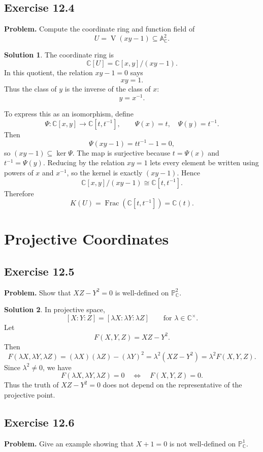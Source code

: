 \documentclass[11pt]{article}
\theoremstyle{definition}
\newtheorem*{solution}{Solution}
\newcommand{\A}{\mathbb{A}}
\newcommand{\C}{\mathbb{C}}
\newcommand{\Pj}{\mathbb{P}}
\newcommand{\K}{K}
\newcommand{\V}{\operatorname{V}}
\newcommand{\Frac}{\operatorname{Frac}}
\begin{document}
\subsection*{Exercise 12.4}
\textbf{Problem.}  Compute the coordinate ring and function field of
\[
  U=\V(xy-1)\subseteq \A^2_{\C}.
\]

\begin{solution}
The coordinate ring is
\[
  \C[U]=\C[x,y]/(xy-1).
\]
In this quotient, the relation \(xy-1=0\) says
\[
  xy=1.
\]
Thus the class of \(y\) is the inverse of the class of \(x\):
\[
  y=x^{-1}.
\]

To express this as an isomorphism, define
\[
  \Psi\colon \C[x,y]\longrightarrow \C[t,t^{-1}],
  \qquad
  \Psi(x)=t,\quad \Psi(y)=t^{-1}.
\]
Then
\[
  \Psi(xy-1)=tt^{-1}-1=0,
\]
so \((xy-1)\subseteq\ker\Psi\).  The map is surjective because \(t=\Psi(x)\)
and \(t^{-1}=\Psi(y)\).  Reducing by the relation \(xy=1\) lets every element
be written using powers of \(x\) and \(x^{-1}\), so the kernel is exactly
\((xy-1)\).  Hence
\[
  \C[x,y]/(xy-1)\cong \C[t,t^{-1}].
\]
Therefore
\[
  \K(U)=\Frac(\C[t,t^{-1}])=\C(t).
\]
\end{solution}

\section{Projective Coordinates}

\subsection*{Exercise 12.5}
\textbf{Problem.}  Show that \(XZ-Y^2=0\) is well-defined on
\(\Pj^2_{\C}\).

\begin{solution}
In projective space,
\[
  [X:Y:Z]=[\lambda X:\lambda Y:\lambda Z]
  \qquad
  \text{for }\lambda\in\C^\times.
\]
Let
\[
  F(X,Y,Z)=XZ-Y^2.
\]
Then
\[
  F(\lambda X,\lambda Y,\lambda Z)
  =
  (\lambda X)(\lambda Z)-(\lambda Y)^2
  =
  \lambda^2(XZ-Y^2)
  =
  \lambda^2F(X,Y,Z).
\]
Since \(\lambda^2\neq 0\), we have
\[
  F(\lambda X,\lambda Y,\lambda Z)=0
  \quad\Longleftrightarrow\quad
  F(X,Y,Z)=0.
\]
Thus the truth of \(XZ-Y^2=0\) does not depend on the representative of the
projective point.
\end{solution}

\subsection*{Exercise 12.6}
\textbf{Problem.}  Give an example showing that \(X+1=0\) is not
well-defined on \(\Pj^1_{\C}\).
\end{document}
